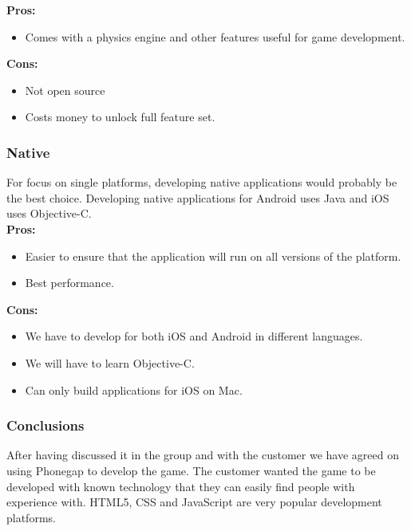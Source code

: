 \indent
  {\bf Pros:}
  \begin{itemize}
    \item Comes with a physics engine and other features useful for game development.
  \end{itemize}

\indent
  {\bf Cons:}
  \begin{itemize}
    \item Not open source
    \item Costs money to unlock full feature set.
  \end{itemize}

\subsubsection{Native}
For focus on single platforms, developing native applications would probably be the best 
choice. Developing native applications for Android uses Java and iOS uses Objective-C.\\

\indent
  {\bf Pros:}
  \begin{itemize}
    \item Easier to ensure that the application will run on all versions of the platform.
    \item Best performance.
  \end{itemize}

\indent
  {\bf Cons:}
  \begin{itemize}
    \item We have to develop for both iOS and Android in different languages.
    \item We will have to learn Objective-C.
    \item Can only build applications for iOS on Mac.
  \end{itemize}

\noindent
\subsubsection{Conclusions}
After having discussed it in the group and with the customer we have agreed on using 
Phonegap to develop the game. The customer wanted the game to be developed with known 
technology that they can easily find people with experience with. HTML5, CSS and 
JavaScript are very popular development platforms.
